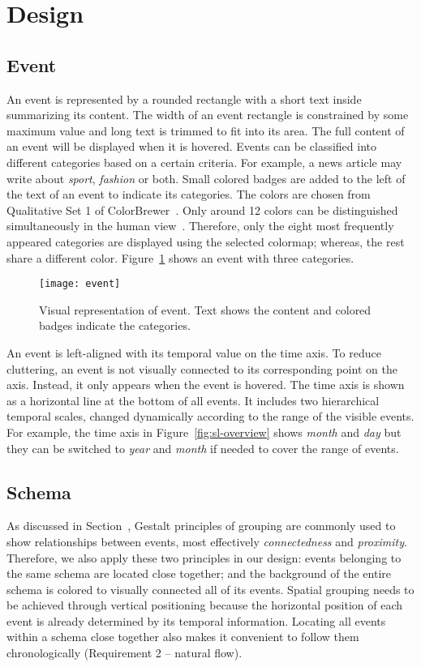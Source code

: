 \section{Design}

\subsection{Event}
An event is represented by a rounded rectangle with a short text inside summarizing its content. The width of an event rectangle is constrained by some maximum value and long text is trimmed to fit into its area. The full content of an event will be displayed when it is hovered. Events can be classified into different categories based on a certain criteria. For example, a news article may write about \emph{sport}, \emph{fashion} or both. Small colored badges are added to the left of the text of an event to indicate its categories. The colors are chosen from Qualitative Set 1 of  ColorBrewer~\cite{Harrower2003}. Only around 12 colors can be distinguished simultaneously in the human view~\cite{Munzner2014}. Therefore, only the eight most frequently appeared categories are displayed using the selected colormap; whereas, the rest share a different color. Figure~\ref{fig:event} shows an event with three categories.

\begin{figure}[!htb]
\centering
\texttt{[image: event]}
\caption{Visual representation of event. Text shows the content and colored badges indicate the categories.}
\label{fig:event}
\end{figure}

An event is left-aligned with its temporal value on the time axis. To reduce cluttering, an event is not visually connected to its corresponding point on the axis. Instead, it only appears when the event is hovered. The time axis is shown as a horizontal line at the bottom of all events. It includes two hierarchical temporal scales, changed dynamically according to the range of the visible events. For example, the time axis in Figure~\ref{fig:sl-overview} shows \emph{month} and \emph{day} but they can be switched to \emph{year} and \emph{month} if needed to cover the range of events.

\subsection{Schema}
\label{sub:schema}
As discussed in Section~, Gestalt principles of grouping are commonly used to show relationships between events, most effectively \emph{connectedness} and \emph{proximity}. Therefore, we also apply these two principles in our design: events belonging to the same schema are located close together; and the background of the entire schema is colored to visually connected all of its events. Spatial grouping needs to be achieved through vertical positioning because the horizontal position of each event is already determined by its temporal information. Locating all events within a schema close together also makes it convenient to follow them chronologically (Requirement 2 -- natural flow).

